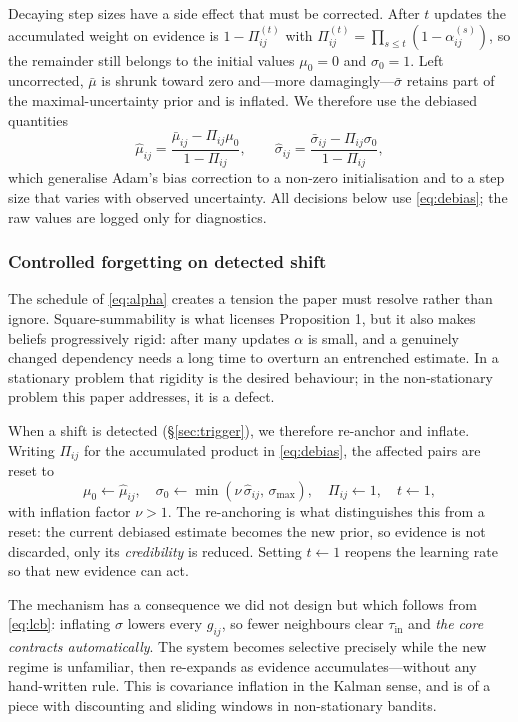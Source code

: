 \documentclass[conference]{IEEEtran}
\begin{document}
Decaying step sizes have a side effect that must be corrected. After $t$ updates the accumulated weight on evidence is $1-\Pi^{(t)}_{ij}$ with $\Pi^{(t)}_{ij}=\prod_{s\le t}(1-\alpha^{(s)}_{ij})$, so the remainder still belongs to the initial values $\mu_0=0$ and $\sigma_0=1$. Left uncorrected, $\bar\mu$ is shrunk toward zero and---more damagingly---$\bar\sigma$ retains part of the maximal-uncertainty prior and is inflated. We therefore use the debiased quantities
\begin{equation}
\hat\mu_{ij}=\frac{\bar\mu_{ij}-\Pi_{ij}\mu_0}{1-\Pi_{ij}},
\qquad
\hat\sigma_{ij}=\frac{\bar\sigma_{ij}-\Pi_{ij}\sigma_0}{1-\Pi_{ij}},
\label{eq:debias}
\end{equation}
which generalise Adam's bias correction \cite{kingma2015adam} to a non-zero initialisation and to a step size that varies with observed uncertainty. All decisions below use \eqref{eq:debias}; the raw values are logged only for diagnostics.

\subsubsection{Controlled forgetting on detected shift}
The schedule of \eqref{eq:alpha} creates a tension the paper must resolve rather than ignore. Square-summability is what licenses Proposition 1, but it also makes beliefs progressively rigid: after many updates $\alpha$ is small, and a genuinely changed dependency needs a long time to overturn an entrenched estimate. In a stationary problem that rigidity is the desired behaviour; in the non-stationary problem this paper addresses, it is a defect.

When a shift is detected (\S\ref{sec:trigger}), we therefore re-anchor and inflate. Writing $\Pi_{ij}$ for the accumulated product in \eqref{eq:debias}, the affected pairs are reset to
\begin{equation}
\mu_0\!\leftarrow\!\hat\mu_{ij},
\quad
\sigma_0\!\leftarrow\!\min(\nu\,\hat\sigma_{ij},\,\sigma_{\max}),
\quad
\Pi_{ij}\!\leftarrow\!1,
\quad
t\!\leftarrow\!1,
\label{eq:inflate}
\end{equation}
with inflation factor $\nu>1$. The re-anchoring is what distinguishes this from a reset: the current debiased estimate becomes the new prior, so evidence is not discarded, only its \emph{credibility} is reduced. Setting $t\!\leftarrow\!1$ reopens the learning rate so that new evidence can act.

The mechanism has a consequence we did not design but which follows from \eqref{eq:lcb}: inflating $\hat\sigma$ lowers every $g_{ij}$, so fewer neighbours clear $\tau_{\mathrm{in}}$ and \emph{the core contracts automatically}. The system becomes selective precisely while the new regime is unfamiliar, then re-expands as evidence accumulates---without any hand-written rule. This is covariance inflation in the Kalman sense, and is of a piece with discounting and sliding windows in non-stationary bandits.
\end{document}
